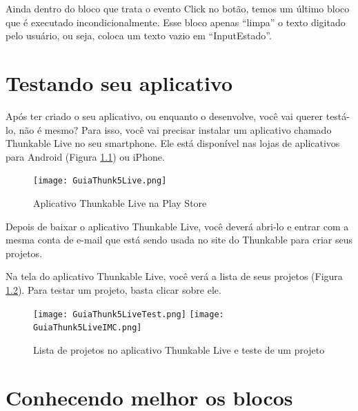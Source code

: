 \documentclass[11pt,fleqn]{book} %
\begin{document}
Ainda dentro do bloco que trata o evento Click no botão, temos um último bloco que é executado incondicionalmente.  Esse bloco apenas ``limpa'' o texto digitado pelo usuário, ou seja, coloca um texto vazio em ``InputEstado''.




\chapter{Testando seu aplicativo}\label{ch:teste}

Após ter criado o seu aplicativo, ou enquanto o desenvolve, você vai querer testá-lo, não é mesmo? Para isso, você vai precisar instalar um aplicativo chamado Thunkable Live no seu smartphone. Ele está disponível nas lojas de aplicativos para Android (Figura \ref{fig:live}) ou iPhone.




\begin{figure}[H]
	\centering
    \texttt{[image: GuiaThunk5Live.png]}
    \caption{Aplicativo Thunkable Live na Play Store}\label{fig:live}
\end{figure}

Depois de baixar o aplicativo Thunkable Live, você deverá abri-lo e entrar com a mesma conta de e-mail que está sendo usada no site do Thunkable para criar seus projetos.

Na tela do aplicativo Thunkable Live, você verá a lista de seus projetos (Figura \ref{fig:livetest}). Para testar um projeto, basta clicar sobre ele.

\begin{figure}[H]
	\centering
    \texttt{[image: GuiaThunk5LiveTest.png]}
    \texttt{[image: GuiaThunk5LiveIMC.png]}

    \caption{Lista de projetos no aplicativo Thunkable Live e teste de um projeto}\label{fig:livetest}
\end{figure}



\chapter{Conhecendo melhor os blocos}
\end{document}
